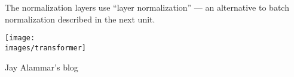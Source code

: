 {\vfill
The normalization layers use ``layer normalization'' --- an alternative to batch normalization described in the next unit.


\centerline{\texttt{[image: \\images/transformer]}}

{\Large
\centerline{Jay Alammar's blog}
}


}

